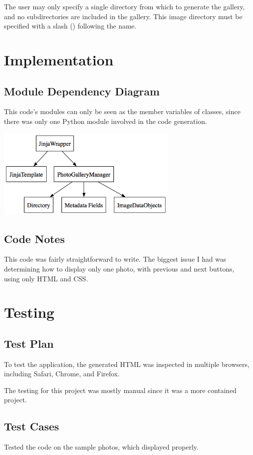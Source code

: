 \documentclass[11pt,letterpaper]{article}
\begin{document}
The user may only specify a single directory from which to generate the gallery, and no subdirectories are included in the gallery. This image directory must be specified with a slash (\/) following the name.


\section{Implementation}

\subsection{Module Dependency Diagram}
This code's modules can only be seen as the member variables of classes, since there was only one Python module involved in the code generation.
\begin{center}
\includegraphics[width=250pt]{dot/moddepdiagram.png}
\label{fig:ob2} 
\end{center}
\subsection{Code Notes}
This code was fairly straightforward to write. The biggest issue I had was determining how to display only one photo, with previous and next buttons, using only HTML and CSS.

\section{Testing}

\subsection{Test Plan}
To test the application, the generated HTML was inspected in multiple browsers, including Safari, Chrome, and Firefox.

The testing for this project was mostly manual since it was a more contained project.
\subsection{Test Cases}
Tested the code on the sample photos, which displayed properly.
\end{document}
